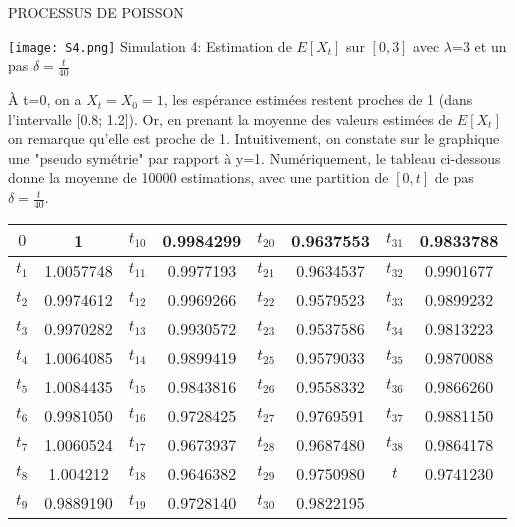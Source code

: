 PROCESSUS DE POISSON\documentclass[a4paper,10pt]{article}
\begin{document}
\begin{center}
\texttt{[image: S4.png]}
Simulation 4: Estimation de $E[X_t]$  sur $[0,3]$ avec  $\lambda$=3 et un pas $\delta=\frac{t}{40}$
\end{center}
À t=0, on a $X_t=X_0=1$, les espérance estimées restent proches de 1 (dans l'intervalle [0.8; 1.2]). Or, en prenant la moyenne des valeurs estimées de $E[X_t]$ on remarque qu'elle est proche de 1. Intuitivement, on constate sur le graphique une "pseudo symétrie" par rapport à y=1. Numériquement, le tableau ci-dessous donne la moyenne de 10000 estimations, avec une partition de $[0,t]$ de pas $\delta=\frac{t}{40}$.
$$
$$
\begin{center}
\begin{tabular}{|*{8}{c|}}
  \hline
   $0$    &   1		      & $t_{10}$ &    0.9984299  &	$t_{20}$ &   0.9637553  & $t_{31}$ &    0.9833788  \\
\hline
   $t_1$ &   1.0057748  & $t_{11}$ &    0.9977193  &	$t_{21}$ &   0.9634537  & $t_{32}$ &    0.9901677  \\ 
\hline
   $t_2$ &   0.9974612  & $t_{12}$ &    0.9969266  &	$t_{22}$ &   0.9579523  & $t_{33}$ &   0.9899232  \\ 
\hline
   $t_3$ &   0.9970282  & $t_{13}$ &    0.9930572  &	$t_{23}$ &   0.9537586  & $t_{34}$ &   0.9813223  \\    
\hline
   $t_4$ &   1.0064085  & $t_{14}$ &    0.9899419  &	$t_{25}$ &   0.9579033  & $t_{35}$ &   0.9870088  \\ 
\hline
   $t_5$ &   1.0084435  & $t_{15}$ &    0.9843816  &	$t_{26}$ &   0.9558332  & $t_{36}$ &   0.9866260  \\ 
\hline
   $t_6$ &   0.9981050  & $t_{16}$ &    0.9728425  &	$t_{27}$ &   0.9769591  & $t_{37}$ &  0.9881150  \\ 
\hline
   $t_7$ &   1.0060524  & $t_{17}$ &    0.9673937  &	$t_{28}$ &   0.9687480  & $t_{38}$ &   0.9864178  \\  
\hline
   $t_8$ &   1.004212    & $t_{18}$ &    0.9646382  &	$t_{29}$ &   0.9750980  & $t$ 	      &   0.9741230  \\ 
\hline
   $t_9$ &   0.9889190  & $t_{19}$ &    0.9728140  &	$t_{30}$ &   0.9822195  \\ 
\hline
\end{tabular}
\end{center}
 
\end{document}
